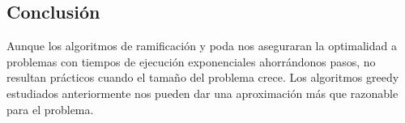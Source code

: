\subsection{Conclusión}
\begin{frame}
	\begin{alertblock}
	Aunque los algoritmos de ramificación y poda nos aseguraran la optimalidad a problemas con
	tiempos de ejecución exponenciales ahorrándonos pasos, no resultan prácticos cuando el tamaño
	del problema crece. Los algoritmos greedy estudiados anteriormente nos pueden dar una 
	aproximación más que razonable para el problema.
	\end{alertblock}
\end{frame}
